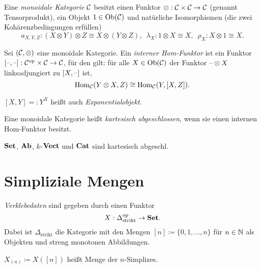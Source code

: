 \documentclass{cheat-sheet}
\begin{document}
\begin{defn}
  Eine \emph{monoidale Kategorie} $\mathcal{C}$ besitzt einen Funktor $\otimes : \mathcal{C} \times \mathcal{C} \to \mathcal{C}$ (genannt Tensorprodukt), ein Objekt $1 \in \operatorname{Ob}(\mathcal{C})$ und natürliche Isomorphismen
  (die zwei Kohärenzbedingungen erfüllen)
  \[
    a_{X,Y,Z} : (X \otimes Y) \otimes Z \cong X \otimes (Y \otimes Z), \enspace
    \lambda_X : 1 \otimes X \cong X, \enspace
    \rho_X : X \otimes 1 \cong X.
  \]
\end{defn}

\begin{defn}
  Sei $(\mathcal{C}, \otimes)$ eine monoidale Kategorie. Ein \emph{interner Hom-Funktor} ist ein Funktor $[\text{--},\text{--}] : \mathcal{C}^{\mathrm{op}} \times \mathcal{C} \to \mathcal{C}$, für den gilt: für alle $X \in \operatorname{Ob}(\mathcal{C})$ der Funktor $\text{--} \otimes X$ linksadjungiert zu $[X, \text{--}]$ ist, \dh{}
  \[ \operatorname{Hom}_{\mathcal{C}}(Y \otimes X, Z) \cong \operatorname{Hom}_{\mathcal{C}}(Y, [X, Z]). \]
\end{defn}

\begin{nota}
  $[X, Y] =: Y^X$ heißt auch \emph{Exponentialobjekt}.
\end{nota}

\begin{defn}
  Eine monoidale Kategorie heißt \emph{kartesisch abgeschlossen}, wenn sie einen internen Hom-Funktor besitzt.
\end{defn}

\begin{bspe}
  $\mathbf{Set}$, $\mathbf{Ab}$, $k$-$\mathbf{Vect}$ und $\mathbf{Cat}$ sind kartesisch abgeschl.
\end{bspe}



\section{Simpliziale Mengen}


\begin{defn}
  \emph{Verklebedaten} sind gegeben durch einen Funktor
  \[ X : \Delta_{\text{strikt}}^{\mathrm{op}} \to \mathbf{Set}. \]
  Dabei ist $\Delta_{\text{strikt}}$ die Kategorie mit den Mengen
  $[n] \coloneqq \{ 0, 1, \ldots, n \}$ für $n \in \mathbb{N}$ als Objekten und streng monotonen Abbildungen.
\end{defn}

\begin{nota}
  $X_{(n)} \coloneqq X([n])$ heißt Menge der $n$-Simplizes.
\end{nota}
\end{document}
